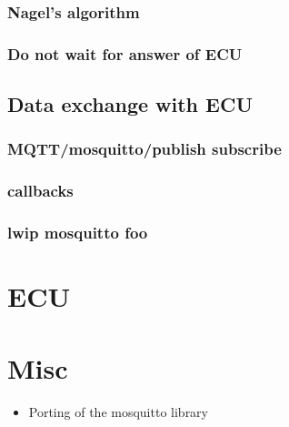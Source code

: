 \documentclass[paper=a4, fontsize=11pt]{scrartcl}
\begin{document}
  \subsubsection{Nagel's algorithm}
  \subsubsection{Do not wait for answer of ECU}
\subsection{Data exchange with ECU}
  \subsubsection{MQTT/mosquitto/publish subscribe}
  \subsubsection{callbacks}
  \subsubsection{lwip mosquitto foo}
\section{ECU}
\section{Misc}
\begin{itemize}
  \item Porting of the mosquitto library %
\end{itemize}
\end{document}
